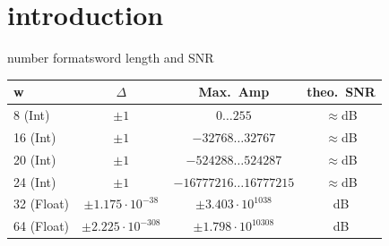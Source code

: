 



\subtitle{Part 13: Digital Number Formats}


	

\section[intro]{introduction}

	\begin{frame}{number formats}{word length and SNR}
			\begin{table}
			\centering
				\begin{footnotesize}
					\begin{tabular}{lccc}
					\hline
						\textbf{w} & \textbf{$\Delta$} & \textbf{Max.\ Amp} & \textbf{theo.\ SNR} \\
					\hline
						8 (Int)	&	$\pm1$ & $0\ldots255$ & $\approx$\unit[48]{dB}\\
						16 (Int)	&	$\pm1$ & $-32768\ldots32767$ & $\approx$\unit[96]{dB}\\
						20 (Int)	&	$\pm1$ & $-524288\ldots524287$ & $\approx$\unit[120]{dB}\\
						24 (Int)	&	$\pm1$ & $-16777216\ldots16777215$ & $\approx$\unit[144]{dB}\\
					\hline
						32 (Float)	&	$\pm1.175\cdot10^{-38}$ & $\pm3.403\cdot10^{1038}$ & \unit[1529]{dB}\\
						64 (Float)	&	$\pm2.225\cdot10^{-308}$ & $\pm1.798\cdot10^{10308}$ & \unit[12318]{dB}\\
					\hline
					\end{tabular}  
				\end{footnotesize}
			\end{table}
            
            \bigskip
            \bigskip
	\end{frame}	

